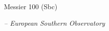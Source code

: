\documentclass[letterpaper,landscape]{slides}
\begin{document}
\begin{slide}
\begin{center}
{\large \color{red} 
                  Messier 100 (Sbc)  }
\end{center}

\begin{center}
\vskip -0.0in
\end{center}

\begin{flushright}
{ \tiny \em -- European Southern Observatory }
\end{flushright}

\vfill
\end{slide}
\end{document}
